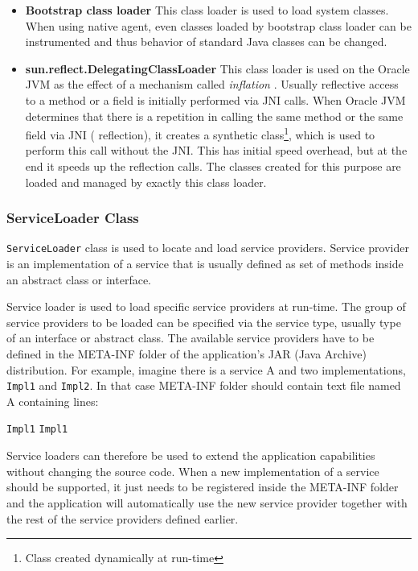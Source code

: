 \begin{itemize}
	\item\textbf{Bootstrap class loader} \newline
	This class loader is used to load system classes. When using native agent, even classes loaded by bootstrap class loader can be instrumented and thus behavior of standard Java classes can be changed.
	
	\item  \textbf{sun.reflect.DelegatingClassLoader} \newline
	This class loader is used on the Oracle JVM as the effect of a mechanism called \textit{inflation} \cite{inflatation}. Usually reflective access to a method or a field is initially performed via JNI calls. When Oracle JVM determines that there is a repetition in calling the same method or the same field via JNI ( reflection), it creates a synthetic class\footnote{Class created dynamically at run-time}, which is used to perform this call without the JNI. This has initial speed overhead, but at the end it speeds up the reflection calls. The classes created for this purpose are loaded and managed by exactly this class loader. 
\end{itemize}
\subsubsection{ServiceLoader Class}
\texttt{ServiceLoader} class is used to locate and load service providers. Service provider is an implementation of a service that is usually defined as set of methods inside an abstract class or interface. 

Service loader is used to load specific service providers at run-time. The group of service providers to be loaded can be specified via the service type, usually type of an interface or abstract class. The available service providers have to be defined in the META-INF folder of the application's JAR (Java Archive) distribution. For example, imagine there is a service A and two implementations, \texttt{Impl1} and \texttt{Impl2}. In that case META-INF folder should contain text file named A containing lines:
\begin{center}
\texttt{Impl1} \newline
\texttt{Impl1}  \newline
\end{center}
Service loaders can therefore be used to extend the application capabilities without changing the source code. When a new implementation of a service should be supported, it just needs to be registered inside the META-INF folder and the application will automatically use the new service provider together with the rest of the service providers defined earlier.
